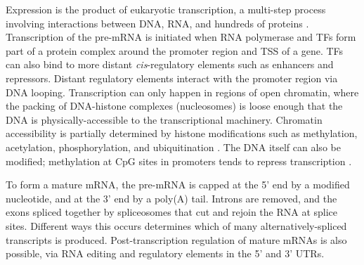 \begin{outline}
Expression is the product of eukaryotic transcription, a multi-step process involving interactions between DNA, RNA, and hundreds of proteins \autocite{cramer2019OrganizationRegulationGene}.
Transcription of the pre-\gls{mRNA} is initiated when RNA polymerase and \glspl{TF} form part of a protein complex around the promoter region and \gls{TSS} of a gene.
\Glspl{TF} can also bind to more distant \textit{cis}-regulatory elements such as enhancers and repressors.
Distant regulatory elements interact with the promoter region via DNA looping.
Transcription can only happen in regions of open chromatin, where the packing of DNA-histone complexes (nucleosomes) is loose enough that the DNA is physically-accessible to the transcriptional machinery.
Chromatin accessibility is partially determined by histone modifications such as methylation, acetylation, phosphorylation, and ubiquitination \autocite{bannister2011RegulationChromatinHistone}.
The DNA itself can also be modified; methylation at CpG sites in promoters tends to repress transcription \autocite{robertson2000DNAMethylationHealth}.

To form a mature \gls{mRNA}, the pre-\gls{mRNA} is capped at the 5' end by a modified nucleotide, and at the 3' end by a poly(A) tail.
Introns are removed, and the exons spliced together by spliceosomes that cut and rejoin the RNA at splice sites.
Different ways this occurs determines which of many alternatively-spliced transcripts is produced.
Post-transcription regulation of mature \glspl{mRNA} is also possible, via RNA editing and regulatory elements in the 5' and 3' \glspl{UTR}.


\end{outline}
